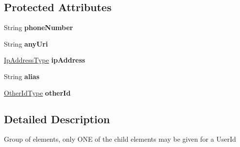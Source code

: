 \subsection*{Protected Attributes}
\begin{DoxyCompactItemize}
\item 
\hypertarget{classcom_1_1telefonica_1_1schemas_1_1unica_1_1rpc_1_1common_1_1v1_1_1UserIdType_aca5b869247ccd8272df42990d2334b7e}{
String {\bfseries phoneNumber}}
\label{classcom_1_1telefonica_1_1schemas_1_1unica_1_1rpc_1_1common_1_1v1_1_1UserIdType_aca5b869247ccd8272df42990d2334b7e}

\item 
\hypertarget{classcom_1_1telefonica_1_1schemas_1_1unica_1_1rpc_1_1common_1_1v1_1_1UserIdType_aa094dd04ada1a99ce48c9f8c12e6e455}{
String {\bfseries anyUri}}
\label{classcom_1_1telefonica_1_1schemas_1_1unica_1_1rpc_1_1common_1_1v1_1_1UserIdType_aa094dd04ada1a99ce48c9f8c12e6e455}

\item 
\hypertarget{classcom_1_1telefonica_1_1schemas_1_1unica_1_1rpc_1_1common_1_1v1_1_1UserIdType_a95b7b49cc669fc31e59f853ba681c291}{
\hyperlink{classcom_1_1telefonica_1_1schemas_1_1unica_1_1rpc_1_1common_1_1v1_1_1IpAddressType}{IpAddressType} {\bfseries ipAddress}}
\label{classcom_1_1telefonica_1_1schemas_1_1unica_1_1rpc_1_1common_1_1v1_1_1UserIdType_a95b7b49cc669fc31e59f853ba681c291}

\item 
\hypertarget{classcom_1_1telefonica_1_1schemas_1_1unica_1_1rpc_1_1common_1_1v1_1_1UserIdType_aeca737f63b855a5510c7d78eab1be9e0}{
String {\bfseries alias}}
\label{classcom_1_1telefonica_1_1schemas_1_1unica_1_1rpc_1_1common_1_1v1_1_1UserIdType_aeca737f63b855a5510c7d78eab1be9e0}

\item 
\hypertarget{classcom_1_1telefonica_1_1schemas_1_1unica_1_1rpc_1_1common_1_1v1_1_1UserIdType_a4d936d71c6cb8a77af2832fa15c62821}{
\hyperlink{classcom_1_1telefonica_1_1schemas_1_1unica_1_1rpc_1_1common_1_1v1_1_1OtherIdType}{OtherIdType} {\bfseries otherId}}
\label{classcom_1_1telefonica_1_1schemas_1_1unica_1_1rpc_1_1common_1_1v1_1_1UserIdType_a4d936d71c6cb8a77af2832fa15c62821}

\end{DoxyCompactItemize}


\subsection{Detailed Description}
Group of elements, only ONE of the child elements may be given for a UserId

